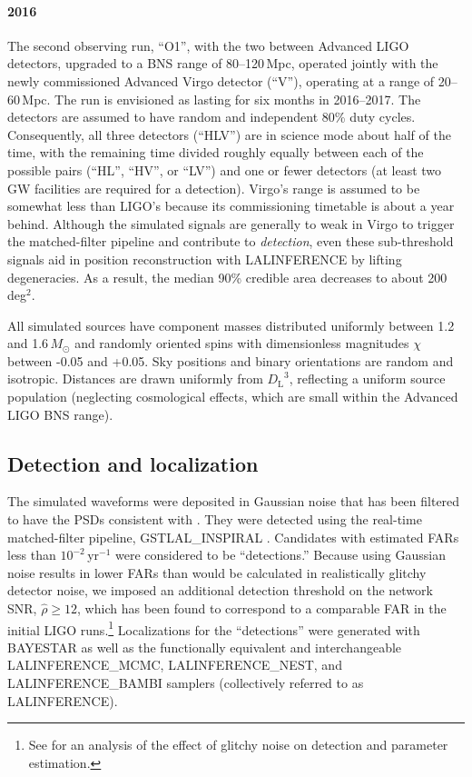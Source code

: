 \documentclass[amsmath,amssymb,aps,prx,reprint,nopreprintnumbers,nofootinbib]{revtex4-1}
\begin{document}
\paragraph*{2016} The second observing run, ``O1'', with the two between Advanced \acs{LIGO} detectors, upgraded to a \ac{BNS} range of 80\nobreakdashes--120\,Mpc, operated jointly with the newly commissioned Advanced Virgo detector (``V''), operating at a range of 20\nobreakdashes--60\,Mpc. The run is envisioned as lasting for six months in 2016\nobreakdashes--2017. The detectors are assumed to have random and independent 80\% duty cycles. Consequently, all three detectors (``HLV'') are in science mode about half of the time, with the remaining time divided roughly equally between each of the possible pairs (``HL'', ``HV'', or ``LV'') and one or fewer detectors (at least two \ac{GW} facilities are required for a detection). Virgo's range is assumed to be somewhat less than \acs{LIGO}'s because its commissioning timetable is about a year behind. Although the simulated signals are generally to weak in Virgo to trigger the matched\nobreakdashes-filter pipeline and contribute to \emph{detection}, even these sub\nobreakdashes-threshold signals aid in position reconstruction with LALINFERENCE by lifting degeneracies. As a result, the median 90\% credible area decreases to about 200\,deg$^2$.

All simulated sources have component masses distributed uniformly between 1.2 and 1.6\,$M_\odot$ and randomly oriented spins with dimensionless magnitudes $\chi$ between -0.05 and +0.05. Sky positions and binary orientations are random and isotropic. Distances are drawn uniformly from ${D_\mathrm{L}}^3$, reflecting a uniform source population (neglecting cosmological effects, which are small within the Advanced \acs{LIGO} \ac{BNS} range).

\subsection{Detection and localization}

The simulated waveforms were deposited in Gaussian noise that has been filtered to have the \acp{PSD} consistent with \cite{LIGOObservingScenarios}. They were detected using the real\nobreakdashes-time matched\nobreakdashes-filter pipeline, GSTLAL\_INSPIRAL \citep{Cannon:2011vi}. Candidates with estimated \acp{FAR} less than $10^{-2}$\,yr$^{-1}$ were considered to be ``detections.'' Because using Gaussian noise results in lower \acp{FAR} than would be calculated in realistically glitchy detector noise, we imposed an additional detection threshold on the network \ac{SNR}, $\hat{\rho} \geq 12$, which has been found to correspond to a comparable \ac{FAR} in the initial \ac{LIGO} runs.\footnote{See \cite{BerryLocalization} for an analysis of the effect of glitchy noise on detection and parameter estimation.} Localizations for the ``detections'' were generated with \ac{BAYESTAR} as well as the functionally equivalent and interchangeable LALINFERENCE\_MCMC, LALINFERENCE\_NEST, and LALINFERENCE\_BAMBI samplers (collectively referred to as LALINFERENCE).
\end{document}
